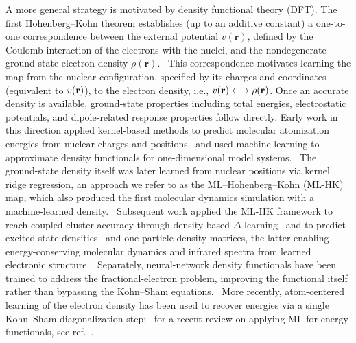 \documentclass[12pt]{article}
\begin{document}
A more general strategy is motivated by density functional theory (DFT).
The first Hohenberg--Kohn theorem establishes (up to an additive constant) a one-to-one correspondence between the external potential $v(\mathbf r)$, defined by the Coulomb interaction of the electrons with the nuclei, and the nondegenerate ground-state electron density $\rho(\mathbf r)$.~\cite{hohenberg1964inhomogeneous} 
This correspondence motivates learning the map from the nuclear configuration, specified by its charges and coordinates (equivalent to $v({\bf r})$), to the electron density, i.e., $v({\bf r}) \longleftrightarrow \rho({\bf r})$. 
Once an accurate density is available, ground-state properties including total energies, electrostatic potentials, and dipole-related response properties follow directly. 
Early work in this direction applied kernel-based methods to predict molecular atomization energies from nuclear charges and positions~\cite{rupp2012fast} and used machine learning to approximate density functionals for one-dimensional model systems.~\cite{snyder2012finding,li2014understanding}
The ground-state density itself was later learned from nuclear positions via kernel ridge regression, an approach we refer to as the ML--Hohenberg--Kohn (ML-HK) map, which also produced the first molecular dynamics simulation with a machine-learned density.~\cite{brockherde2017bypassing}
Subsequent work applied the ML-HK framework to reach coupled-cluster accuracy through density-based $\Delta$-learning~\cite{bogojeski2020quantum} and to predict excited-state densities~\cite{bai2022machine} and one-particle density matrices, the latter enabling energy-conserving molecular dynamics and infrared spectra from learned electronic structure.~\cite{shao2023machine}
Separately, neural-network density functionals have been trained to address the fractional-electron problem, improving the functional itself rather than bypassing the Kohn--Sham equations.~\cite{kirkpatrick2021pushing}
More recently, atom-centered learning of the electron density has been used to recover energies via a single Kohn--Sham diagonalization step;~\cite{grisafi2022electronic} for a recent review on applying ML for energy functionals, see ref.~\cite{huang2023dft}. 
\end{document}
